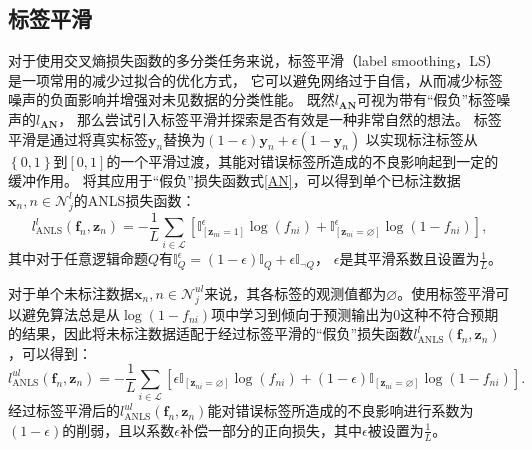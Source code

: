 \subsection{标签平滑}\label{Chapter:LS}
对于使用交叉熵损失函数的多分类任务来说，标签平滑（label smoothing，LS）是一项常用的减少过拟合的优化方式，
它可以避免网络过于自信，从而减少标签噪声的负面影响并增强对未见数据的分类性能\cite{Muller_LS_2019, Szegedy_LabelSmooth_2016}。
既然$l_{\mathbf{AN}}$可视为带有“假负”标签噪声的$l_{\mathbf{AN}}$，
那么尝试引入标签平滑并探索是否有效是一种非常自然的想法。
标签平滑是通过将真实标签$\boldsymbol{y}_n$替换为$\left(1-\epsilon\right)\boldsymbol{y}_n+\epsilon\left(1-\boldsymbol{y}_n\right)$
以实现标注标签从$\left\{0,1\right\}$到$\left[0,1\right]$的一个平滑过渡，其能对错误标签所造成的不良影响起到一定的缓冲作用。
将其应用于“假负”损失函数式\eqref{AN}，可以得到单个已标注数据$\boldsymbol x_n,n\in\mathcal{N}_j^l$的ANLS损失函数：
\begin{equation}
    \label{ANLS_l}
    l_{\mathrm{ANLS}}^l\left(\boldsymbol{f}_{n}, \boldsymbol{z}_{n}\right)
    =-\frac{1}{L} \sum_{i \in \mathcal{L}}\left[\mathbb{I}_{\left[\boldsymbol z_{n i}=1\right]}^{\epsilon}
    \log \left(f_{n i}\right) 
    +\mathbb{I}_{\left[\boldsymbol z_{n i} = \varnothing \right]}^{\epsilon} \log \left(1-f_{n i}\right)\right],
\end{equation}
其中对于任意逻辑命题$Q$有$\mathbb{I}_Q^{\epsilon}=\left(1-\epsilon\right)\mathbb{I}_Q+\epsilon\mathbb{I}_{\lnot Q}$，
$\epsilon$是其平滑系数且设置为$\frac{1}{L}$。

对于单个未标注数据$\boldsymbol x_n,n\in\mathcal{N}_j^{ul}$来说，其各标签的观测值都为$\varnothing$。使用标签平滑可以避免算法总是从$\log\left(1-f_{ni}\right)$项中学习到倾向于预测输出为0这种不符合预期的结果，因此将未标注数据适配于经过标签平滑的“假负”损失函数$l_{\mathrm{ANLS}}^l\left(\boldsymbol{f}_{n}, \boldsymbol{z}_{n}\right)$，可以得到：
\begin{equation}
    \label{ANLS_ul}
    l_{\mathrm{ANLS}}^{ul}\left(\boldsymbol{f}_{n}, \boldsymbol{z}_{n}\right)
    =-\frac{1}{L} \sum_{i \in \mathcal{L}}\left[\epsilon \mathbb{I}_{\left[\boldsymbol z_{n i}=\varnothing\right]} \log \left(f_{n i}\right) 
    + \left(1-\epsilon\right)\mathbb{I}_{\left[\boldsymbol z_{n i} = \varnothing \right]} \log \left(1-f_{n i}\right)\right].
\end{equation}
经过标签平滑后的$l_{\mathrm{ANLS}}^{ul}\left(\boldsymbol{f}_{n}, \boldsymbol{z}_{n}\right)$能对错误标签所造成的不良影响进行系数为
$\left(1-\epsilon\right)$的削弱，且以系数$\epsilon$补偿一部分的正向损失，其中$\epsilon$被设置为$\frac{1}{L}$。

